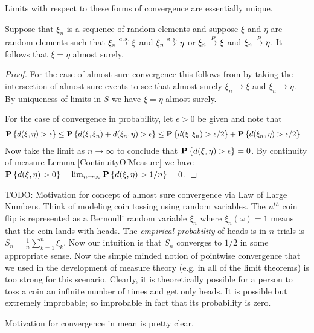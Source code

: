 Limits with respect to these forms of convergence are essentially
unique.
\begin{prop}\label{AlmostSureUniquenessOfLimits}Suppose that $\xi_n$ is a sequence of random elements and
  suppose $\xi$ and $\eta$ are random elements such that $\xi_n \overset{a.s.}\to
  \xi$ and $\xi_n \overset{a.s.}\to \eta$ or $\xi_n \overset{P}\to
  \xi$ and $\xi_n \overset{P}\to \eta$.  It follows that $\xi = \eta$
  almost surely.
\end{prop}
\begin{proof}
For the case  of almost sure convergence this follows from by taking
the intersection of almost sure events to see that almost surely
$\xi_n \to \xi$ and $\xi_n \to \eta$.  By uniqueness of limits in $S$
we have $\xi = \eta$ almost surely.

For the case of convergence in probability, let $\epsilon > 0$ be
given and note that 
\begin{align*}
\textbf{P}\left \{ d(\xi, \eta) > \epsilon \right \} &\leq \textbf{P}\left \{ d(\xi,
  \xi_n )  + d(\xi_n , \eta) > \epsilon \right \} \leq  \textbf{P}\left \{ d(\xi,
  \xi_n ) > \epsilon/2  \right \} + \textbf{P}\left \{ d(\xi_n , \eta) > \epsilon/2 \right \} 
\end{align*}
Now take the limit as $n \to \infty$ to conclude that $\textbf{P}\left \{
  d(\xi, \eta) > \epsilon \right \} = 0$.  By continuity of measure Lemma
\ref{ContinuityOfMeasure} we have $\textbf{P}\left \{d(\xi, \eta) > 0 \right \} =
\lim_{n \to \infty} \textbf{P}\left \{d(\xi, \eta) > 1/n \right \} = 0$.
\end{proof}

TODO: Motivation for concept of almost sure convergence via Law of
Large Numbers.  Think of modeling coin tossing using random
variables.  The $n^{th}$ coin flip is represented as a Bernoulli
random variable $\xi_n$ where $\xi_n(\omega) = 1$ means that the coin
lands with heads.  The \emph{empirical probability} of heads is in $n$
trials is $S_n = \frac{1}{n} \sum_{k=1}^n \xi_k$.  Now our intuition
is that $S_n$ converges to $1/2$ in some appropriate sense.  Now the
simple minded notion of pointwise convergence that we used in the
development of measure theory (e.g. in all of the limit theorems)
is too strong for this scenario.  Clearly, it is theoretically
possible for a person to toss a coin an infinite number of times and
get only heads.  It is possible but extremely improbable; so improbable
in fact that its probability is zero.

Motivation for convergence in mean is pretty clear.

